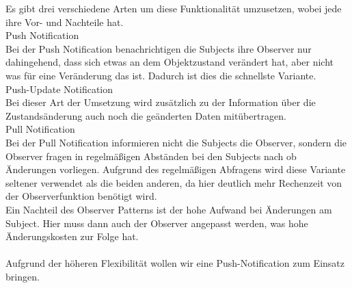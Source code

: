 Es gibt drei verschiedene Arten um diese Funktionalität umzusetzen, wobei jede ihre Vor- und 
Nachteile hat.\\ 
\newline
Push Notification\\
Bei der Push Notification benachrichtigen die Subjects ihre Observer nur dahingehend, dass 
sich etwas an dem Objektzustand verändert hat, aber nicht was für eine Veränderung das ist. 
Dadurch ist dies die schnellste Variante.\\
\newline
Push-Update Notification\\
Bei dieser Art der Umsetzung wird zusätzlich zu der Information über die Zustandsänderung
auch noch die geänderten Daten mitübertragen.\\
\newline
Pull Notification\\
Bei der Pull Notification informieren nicht die Subjects die Observer, sondern die Observer 
fragen in regelmäßigen Abständen bei den Subjects nach ob Änderungen vorliegen. Aufgrund des 
regelmäßigen Abfragens wird diese Variante seltener verwendet als die beiden anderen, da hier 
deutlich mehr Rechenzeit von der Observerfunktion benötigt wird.\\
\newline
Ein Nachteil des Observer Patterns ist der hohe Aufwand bei Änderungen am
Subject. Hier muss dann auch der Observer angepasst werden, was hohe Änderungskosten zur
Folge hat.\cite{wikiObserver}\\\\
Aufgrund der höheren Flexibilität wollen wir eine Push-Notification zum Einsatz bringen.

